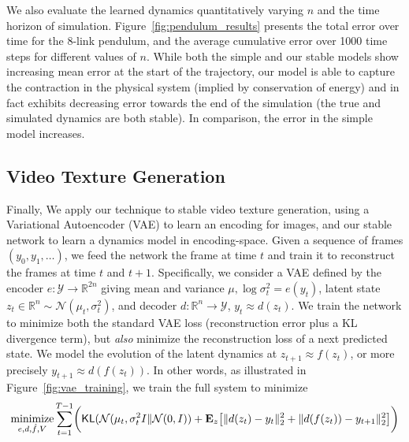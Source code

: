 

We also evaluate the learned dynamics quantitatively varying $n$ and the time horizon of simulation. Figure~\ref{fig:pendulum_results} presents the total error over time for the 8-link pendulum, and the average cumulative error over 1000 time steps for different values of $n$.  While both the simple and our stable models show increasing mean error at the start of the trajectory, our model is able to capture the contraction in the physical system (implied by conservation of energy) and in fact exhibits decreasing error towards the end of the simulation (the true and simulated dynamics are both stable). In comparison, the error in the simple model increases.

\subsection{Video Texture Generation}

Finally, We apply our technique to stable video texture generation, using a Variational Autoencoder (VAE) \citep{kingma2013auto} to learn an encoding for images, and our stable network to learn a dynamics model in encoding-space.  Given a sequence of frames $(y_0, y_1, \ldots)$, we feed the network the frame at time $t$
and train it to reconstruct the frames at time $t$ and $t+1$.  Specifically, we consider a VAE defined by the encoder $e : \mathcal{Y} \rightarrow \mathbb{R}^{2n}$ giving mean and variance $\mu, \log \sigma^2_t = e(y_t)$, latent state $z_t \in \mathbb{R}^n \sim \mathcal{N}(\mu_t, \sigma_t^2)$, and decoder $d: \mathbb{R}^n \rightarrow \mathcal{Y}$, $y_t \approx d(z_t)$.  We train the network to minimize both the standard VAE loss (reconstruction error plus a KL divergence term), but \emph{also} minimize the reconstruction loss of a next predicted state. We model the evolution of the latent dynamics at $z_{t+1} \approx f(z_t)$, or more precisely $y_{t+1} \approx d(f(z_t))$.  In other words, as illustrated in Figure~\ref{fig:vae_training}, we train the full system to minimize
\begin{equation}
    \operatorname*{minimize}_{e,d,\hat{f},V} \sum_{t=1}^{T-1} \biggl ( \mathsf{KL}(\mathcal{N}(\mu_t,\sigma_t^2 I\|\mathcal{N}(0,I)) + \mathbf{E}_z \bigl [ \|d(z_t) - y_t\|_2^2 + \| d(f(z_t)) - y_{t+1}\|_2^2 \bigr ] \biggr )
\end{equation}





